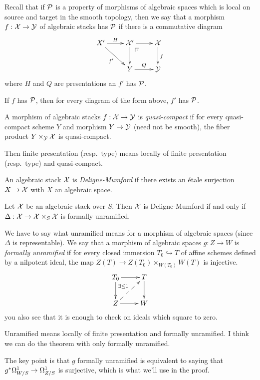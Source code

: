 
 Recall that if $\P$ is a property of morphisms of algebraic spaces which is local on
 source and target in the smooth topology, then we say that a morphism $f:\X\to \Y$ of
 algebraic stacks has $\P$ if there is a commutative diagram
 \[\xymatrix{
    X'\ar[r]^H\ar[dr]_{f'} & \X'\ar[r]\ar[d]\ar@{}[dr]|(.25)\pb & \X\ar[d]^f\\
    & Y\ar[r]^Q & \Y
 }\]
 where $H$ and $Q$ are presentations an $f'$ has $\P$.
 \begin{remark}
   If $f$ has $\P$, then for every diagram of the form above, $f'$ has $\P$.
 \end{remark}
 \begin{definition}
   A morphism of algebraic stacks $f:\X\to \Y$ is \emph{quasi-compact} if for every
   quasi-compact scheme $Y$ and morphism $Y\to \Y$ (need not be smooth), the fiber
   product $Y\times_\Y \X$ is quasi-compact.
 \end{definition}
 Then finite presentation (resp.~type) means locally of finite presentation (resp.~type)
 and quasi-compact.
 \begin{definition}
   An algebraic stack $\X$ is \emph{Deligne-Mumford} if there exists an \'etale
   surjection $X\to \X$ with $X$ an algebraic space.
 \end{definition}
 \begin{theorem}
   Let $\X$ be an algebraic stack over $S$. Then $\X$ is Deligne-Mumford if and only if
   $\Delta:\X\to \X\times_S \X$ is formally unramified.
 \end{theorem}
 \begin{remark}
   We have to say what unramified means for a morphism of algebraic spaces (since
   $\Delta$ is representable). We say that a morphism of algebraic spaces $g:Z\to W$ is
   \emph{formally unramified} if for every closed immersion $T_0\hookrightarrow T$ of
   affine schemes defined by a nilpotent ideal, the map $Z(T)\to
   Z(T_0)\times_{W(T_0)}W(T)$ is injective.
   \[\xymatrix{
    T_0\ar[r]\ar[d] & T\ar[d]\\
    Z\ar[r]\ar@{-->}[ur]^{\exists \le 1} & W
   }\]
   you also see that it is enough to check on ideals which square to zero.

   Unramified means locally of finite presentation  and formally unramified.
   I think we can do the theorem with only formally unramified.

   The key point is that $g$ formally unramified is equivalent to saying that
   $g^*\Om^1_{W/S}\to \Om^1_{Z/S}$  is surjective, which  is
   what we'll use in the proof.
 \end{remark}
